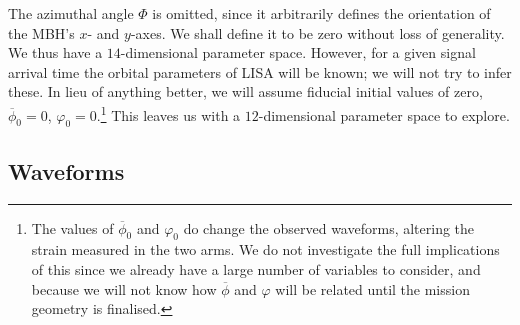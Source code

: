 The azimuthal angle $\Phi$ is omitted, since it arbitrarily defines the orientation of the MBH's $x$- and $y$-axes. We shall define it to be zero without loss of generality. We thus have a $14$-dimensional parameter space. However, for a given signal arrival time the orbital parameters of LISA will be known; we will not try to infer these. In lieu of anything better, we will assume fiducial initial values of zero, $\overline{\phi}_0 = 0$, $\varphi_0 = 0$.\footnote{The values of $\overline{\phi}_0$ and $\varphi_0$ do change the observed waveforms, altering the strain measured in the two arms. We do not investigate the full implications of this since we already have a large number of variables to consider, and because we will not know how $\overline{\phi}$ and $\varphi$ will be related until the mission geometry is finalised.} This leaves us with a $12$-dimensional parameter space to explore.

\subsection{Waveforms}


